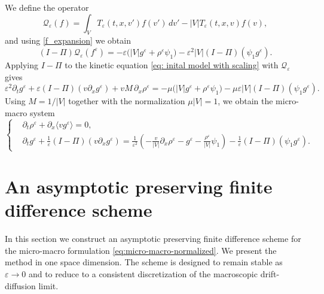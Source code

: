 \documentclass[11pt,twoside]{article}
\numberwithin{equation}{section}
\theoremstyle{plain}
\theoremstyle{nonumberplain}
\begin{document}
{{%
We define the operator
\[
\mathcal{Q}_\varepsilon(f)
=
\int_V T_\varepsilon(t,x,v')f(v')\,dv'
-
|V|T_\varepsilon(t,x,v)f(v),
\]
and using \eqref{f_expansion} we obtain
\[
(I-\Pi)\mathcal Q_\varepsilon(f^\varepsilon)
=
-\varepsilon\bigl(|V|g^\varepsilon+\rho^\varepsilon\psi_1\bigr)
-\varepsilon^2|V|(I-\Pi)(\psi_1g^\varepsilon).
\]
Applying \(I-\Pi\) {to the kinetic equation \eqref{eq: inital model with scaling}} with
\(\mathcal Q_\varepsilon\) gives
\[
\varepsilon^2 \partial_t g^\varepsilon
+
\varepsilon (I-\Pi)(v\partial_x g^\varepsilon)
+
vM\,\partial_x \rho^\varepsilon
=
-\mu\bigl(|V|g^\varepsilon+\rho^\varepsilon\psi_1\bigr)
-\mu\varepsilon |V|(I-\Pi)(\psi_1g^\varepsilon).
\]
Using \(M=1/|V|\) together with the normalization \(\mu |V|=1\), we obtain
the micro-macro system
\begin{equation}\label{eq:micro-macro-normalized}
\left\{
\begin{aligned}
&\partial_t \rho^\varepsilon
+\partial_x \langle v g^\varepsilon\rangle = 0,\\
&\partial_t g^\varepsilon
+\frac1\varepsilon (I-\Pi)(v\partial_x g^\varepsilon)
=
\frac1{\varepsilon^2}
\left(
-\frac{v}{|V|}\partial_x \rho^\varepsilon
-g^\varepsilon
-\frac{\rho^\varepsilon}{|V|}\psi_1
\right)
-\frac1\varepsilon (I-\Pi)(\psi_1g^\varepsilon).
\end{aligned}
\right.
\end{equation}

}





{
\section{An asymptotic preserving finite difference scheme}
\label{sec:scheme}

In this section we construct an asymptotic preserving finite difference
scheme for the micro-macro formulation \eqref{eq:micro-macro-normalized}. We present the method in one space dimension. The scheme is
designed to remain stable as \(\varepsilon\to0\) and to reduce to a
consistent discretization of the macroscopic drift-diffusion limit.

}}
\end{document}
